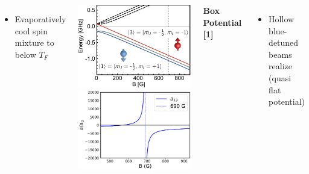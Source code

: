 \documentclass[26pt, paperwidth=36in,paperheight=48in]{tikzposter} %
\newcommand{\myfont}{\fontsize{24}{30}\selectfont}
\begin{document}
\begin{columns}
{\begin{minipage}{0.17\textwidth}
\begin{itemize}
		\item Evaporatively cool spin mixture to below $T_F$
	\end{itemize}
\vspace{2cm}
\end{minipage}
\hspace{0.25cm}
\begin{minipage}{0.15\textwidth}
	\centering
	\includegraphics[width=1.1\textwidth]{figures/BreitRabiLi6.pdf}
	\centering
	\includegraphics[width=1.1\textwidth]{figures/Feshbach_Plot.eps}
\end{minipage}



\vspace{0.5cm}
\begin{minipage}{0.14\textwidth}
	\flushleft
	\textbf{Box Potential [1]}
	\vspace{1cm}
	\myfont
	\begin{itemize}
		\item Hollow blue-detuned beams realize (quasi flat potential)
		

\end{itemize}
\end{minipage}}
\end{columns}
\end{document}
